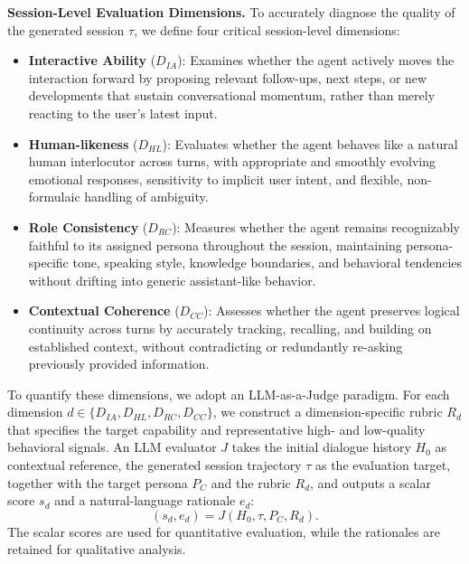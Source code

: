 \noindent \textbf{Session-Level Evaluation Dimensions.}
To accurately diagnose the quality of the generated session $\tau$, we define four critical session-level dimensions:


\begin{itemize}[leftmargin=*]

\item \textbf{Interactive Ability} ($D_{IA}$): Examines whether the agent actively moves the interaction forward by proposing relevant follow-ups, next steps, or new developments that sustain conversational momentum, rather than merely reacting to the user's latest input.

\item \textbf{Human-likeness} ($D_{HL}$): Evaluates whether the agent behaves like a natural human interlocutor across turns, with appropriate and smoothly evolving emotional responses, sensitivity to implicit user intent, and flexible, non-formulaic handling of ambiguity.

\item \textbf{Role Consistency} ($D_{RC}$): Measures whether the agent remains recognizably faithful to its assigned persona throughout the session, maintaining persona-specific tone, speaking style, knowledge boundaries, and behavioral tendencies without drifting into generic assistant-like behavior.

\item \textbf{Contextual Coherence} ($D_{CC}$): Assesses whether the agent preserves logical continuity across turns by accurately tracking, recalling, and building on established context, without contradicting or redundantly re-asking previously provided information.
\end{itemize}



To quantify these dimensions, we adopt an LLM-as-a-Judge paradigm. For each dimension \(d \in \{D_{IA}, D_{HL}, D_{RC}, D_{CC}\}\), we construct a dimension-specific rubric \(R_d\) that specifies the target capability and representative high- and low-quality behavioral signals. An LLM evaluator \(J\) takes the initial dialogue history \(H_0\) as contextual reference, the generated session trajectory \(\tau\) as the evaluation target, together with the target persona \(P_C\) and the rubric \(R_d\), and outputs a scalar score \(s_d\) and a natural-language rationale \(e_d\):
\begin{equation}
    (s_d, e_d) = J(H_0, \tau, P_C, R_d).
\end{equation}
The scalar scores are used for quantitative evaluation, while the rationales are retained for qualitative analysis.




